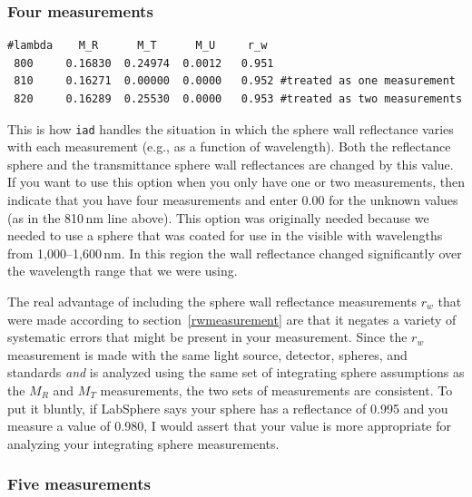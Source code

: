 \documentclass{article}
\newcommand\iadprog{\texttt{iad}}
\begin{document}
\subsubsection{Four measurements}

\begin{center}
\begin{minipage}{8cm}
\scriptsize
\begin{verbatim}
#lambda	   M_R      M_T      M_U     r_w
 800     0.16830  0.24974  0.0012   0.951
 810     0.16271  0.00000  0.0000   0.952 #treated as one measurement
 820     0.16289  0.25530  0.0000   0.953 #treated as two measurements
\end{verbatim}
\end{minipage}
\end{center}
This is how \iadprog{} handles the situation in which the sphere wall reflectance varies
with each measurement (e.g., as a function of wavelength).  Both the
reflectance sphere and the transmittance sphere wall reflectances are
changed by this value.  If you want to use this option when you only
have one or two measurements, then indicate that you have four measurements
and enter 0.00 for the unknown values (as in the 810\,nm line above).
This option was originally needed because we needed to use a sphere that was coated
for use in the visible with wavelengths from 1,000--1,600\,nm.  In this region the wall reflectance
changed significantly over the wavelength range that we were using.

The real advantage of including the sphere wall reflectance measurements $r_w$
that were made according to section~\ref{rwmeasurement} are that it negates a
variety of systematic errors that might be present in your measurement.  Since
the $r_w$ measurement is made with the same light source, detector, spheres, and
standards \textit{and} is analyzed using the same set of integrating sphere 
assumptions as the $M_R$ and $M_T$ measurements, the two sets of measurements
are consistent.  To put it bluntly, if LabSphere says your sphere has a reflectance
of 0.995 and you measure a value of 0.980, I would assert that your value is
more appropriate for analyzing your integrating sphere measurements.  

\subsubsection{Five measurements}
\end{document}
